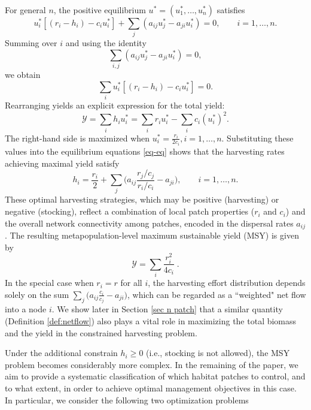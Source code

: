 \documentclass[11pt]{article}
\theoremstyle{definition}
\begin{document}
For general $n$, the positive equilibrium 
$u^*=(u_1^*, \ldots, u_n^*)$ satisfies
\begin{equation}\label{eq-eq}
    u_i^*[(r_i-h_i) - c_iu_i^*] + \sum_j (a_{ij} u_j^* - a_{ji} u_i^*) = 0, \qquad i=1,\ldots,n.
\end{equation}
Summing over $i$ and using the identity
\begin{equation*}
    \sum_{i,j} (a_{ij} u_j^* - a_{ji} u_i^*) = 0,
\end{equation*}
we obtain
\begin{equation*}
    \sum_i u_i^*[(r_i-h_i)-c_iu_i^*] = 0.
\end{equation*}
Rearranging yields an explicit expression for the total yield:
\begin{equation}
    \mathcal{Y} = \sum_i h_i u_i^* = \sum_i r_i u_i^* - \sum_i c_i (u_i^*)^2. 
\end{equation}
The right-hand side is maximized when $u_i^* = \frac{r_i}{2c_i}, i=1,\ldots,n$.  Substituting these values into the equilibrium equations \eqref{eq-eq} shows that the harvesting rates achieving maximal yield satisfy
\begin{equation}\label{eq-hs}
    h_i = \dfrac{r_i}{2} + \sum_j \Big(a_{ij}\frac{r_j/c_j}{r_i/c_i} - a_{ji}\Big), \qquad i=1,\ldots,n.
\end{equation}
These optimal harvesting strategies, which may be positive (harvesting) or negative (stocking), reflect a combination of local patch properties ($r_i$ and $c_i$) and the overall network connectivity among patches, encoded in the dispersal rates $a_{ij}$. The resulting  metapopulation-level maximum sustainable yield (MSY) is given by
\begin{equation}
    \mathcal{Y} = \sum_i \frac{r_i^2}{4c_i} \; .
\end{equation}
 In the special case when $r_i=r$ for all $i$, the harvesting effort distribution depends solely on the sum $\sum_j \Big(a_{ij}\frac{c_i}{c_j} - a_{ji}\Big)$, which can be regarded as a ``weighted" net flow into a node $i$. We show later in Section \ref{sec n patch} that a similar quantity (Definition \ref{def:netflow}) also plays a vital role in maximizing the total biomass and the yield in the constrained harvesting problem.


Under the additional constrain $h_i\ge 0$ (i.e., stocking is not allowed), the MSY problem becomes considerably more complex.  In the remaining of the paper, we aim to provide a systematic classification of which habitat patches to control, and to what extent, in order to achieve optimal management objectives in this case. In particular, we consider the following two optimization problems 
\end{document}

